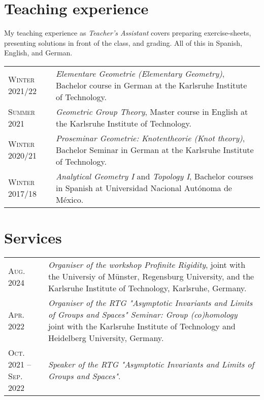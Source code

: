 \documentclass[a4paper,11pt]{article} %
\begin{document}
\section{Teaching experience}

\begin{minipage}{15cm}
My teaching experience as \emph{Teacher's Assistant} covers preparing exercise-sheets, presenting solutions in front of the class, and grading. All of this in Spanish, English, and German.
\end{minipage}

\begin{longtable}{>{\raggedleft\arraybackslash}p{4.2cm}p{10cm}}

    \textsc{Winter 2021/22} & \emph{Elementare Geometrie (Elementary Geometry)}, Bachelor course in German at the Karlsruhe Institute of Technology. \\

    \textsc{Summer 2021} & \emph{Geometric Group Theory}, Master course in English at the Karlsruhe Institute of Technology.\\

    \textsc{Winter 2020/21} & \emph{Proseminar Geometrie: Knotentheorie (Knot theory)}, Bachelor Seminar in German at the Karlsruhe Institute of Technology.\\

    \textsc{Winter 2017/18} & \emph{Analytical Geometry I} and \emph{Topology I}, Bachelor courses in Spanish at Universidad Nacional Autónoma de México.\\
    
\end{longtable}

	
\section{Services}

\begin{longtable}{>{\raggedleft\arraybackslash}p{4.2cm}p{10cm}}

    \textsc{Aug. 2024} & \emph{Organiser of the workshop Profinite Rigidity}, joint with the Universiy of Münster, Regensburg University, and the Karlsruhe Institute of Technology, Karlsruhe, Germany.\\

    \textsc{Apr. 2022} & \emph{Organiser of the RTG "Asymptotic Invariants and Limits of Groups and Spaces"
    Seminar: Group (co)homology} joint with the Karlsruhe Institute of Technology and Heidelberg University, Germany.\\

    \textsc{Oct. 2021 -- Sep. 2022} & \emph{Speaker of the RTG "Asymptotic Invariants and Limits of Groups and Spaces"}.\\

\end{longtable}
\end{document}
